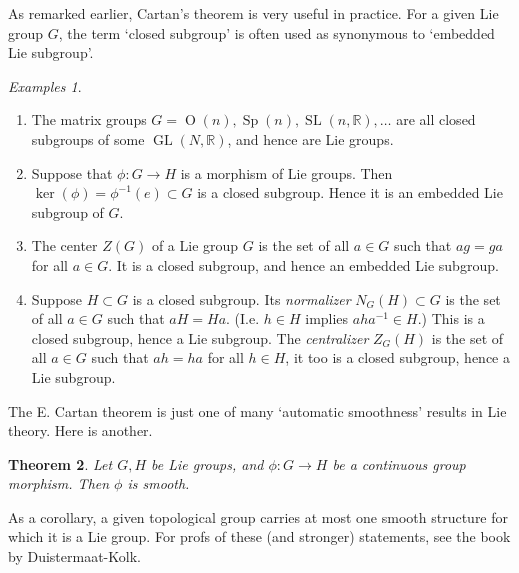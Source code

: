 \documentclass{article}
\newtheorem{theorem}{Theorem}[section]
\theoremstyle{remark}
\newtheorem{examples}[theorem]{Examples}
\newcommand{\R}{\mathbb{R}}
\newcommand{\on}{\operatorname}
\renewcommand{\ker}{ \on{ker}} \newcommand{\im}{ \on{im}}
\newcommand{\GL}{ \on{GL}}
\newcommand{\SL}{ \on{SL}}
\begin{document}
As remarked earlier, Cartan's theorem is very useful in practice. 
For a given Lie group $G$, the term `closed subgroup' is often used 
as synonymous to `embedded Lie subgroup'. 
 
\begin{examples}
\begin{enumerate}
\item The matrix groups $G=\on{O}(n), \on{Sp}(n), \SL(n,\R),\ldots$ are 
all closed subgroups of some $\GL(N,\R)$, and hence are Lie groups. 
\item 
Suppose that $\phi\colon G\to H$ is a morphism of Lie groups. 
Then $\ker(\phi)=\phi^{-1}(e)\subset G$ is a closed subgroup. Hence 
it is an embedded Lie subgroup of $G$. 
\item 
The center $Z(G)$ of a Lie group $G$ is the set of all $a\in G$ such
that $ag=ga$ for all $a\in G$. It is a closed subgroup, and hence an
embedded Lie subgroup.
\item 
Suppose $H\subset G$ is a closed subgroup. Its \emph{normalizer} 
$N_G(H)\subset G$  is the set of all $a\in G$ such that $aH=Ha$. 
(I.e. $h\in H$ implies $aha^{-1}\in H$.) This is a closed subgroup, hence 
a Lie subgroup. The \emph{centralizer} $Z_G(H)$ is the set of all 
$a\in G$ such that $ah=ha$ for all $h\in H$, it too is a closed 
subgroup, hence a Lie subgroup. 
\end{enumerate}
\end{examples}
The E. Cartan theorem is just one of many `automatic smoothness' results in Lie theory. 
Here is another. 
\begin{theorem}
Let $G,H$ be Lie groups, and $\phi\colon G\to H$ be a continuous group morphism. Then 
$\phi$ is smooth.  
\end{theorem}
As a corollary, a given topological group carries at most one smooth structure for which 
it is a Lie group. For profs of these (and stronger) statements, see the book by 
Duistermaat-Kolk. 
\end{document}
